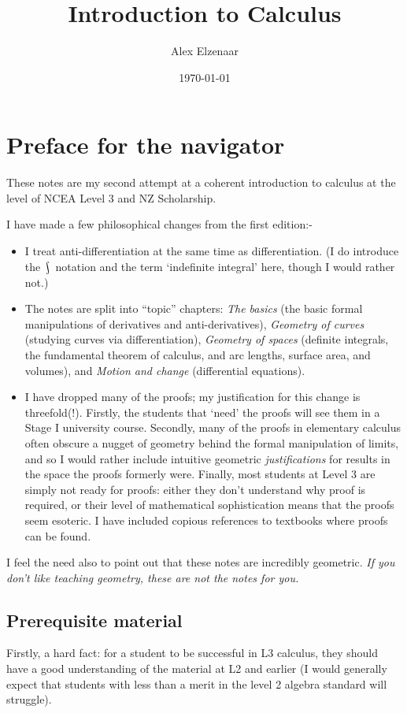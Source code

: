 \documentclass[a4paper]{memoir}
\title{Introduction to Calculus}
\author{Alex Elzenaar}
\date{\today}
\theoremstyle{definition}
\DeclareMathOperator*{\rint}{\scalerel*{\rotatebox{17}{$\!\int\!$}}{\int}}
\newlength\drop
\newcommand*{\titleGM}{\begingroup%
\drop = 0.1\textheight
\vspace*{\baselineskip}
\vfill
  \hbox{%
  \hspace*{0.2\textwidth}%
  \rule{1pt}{\dimexpr\textheight-35pt\relax}%
  \hspace*{0.05\textwidth}%
\parbox[b]{0.75\textwidth}{
  \vbox{%
    \vspace{\drop}
    {\noindent\HUGE\bfseries Level Three\\[0.5\baselineskip] Calculus}\\[2\baselineskip]
    {\Large\itshape Second Edition}\\[4\baselineskip]
    {\Large ALEX ELZENAAR}\par
    \vspace{0.5\textheight}
    {\noindent \url{https://github.com/aelzenaar/ncea-notes}}\\[\baselineskip]
    }%
}%
  }%
\vfill
\null
\endgroup}
\begin{document}
\frontmatter

\begin{titlingpage}
  \titleGM
\end{titlingpage}


\chapter{Preface for the navigator}
These notes are my second attempt at a coherent introduction to calculus at the level of NCEA
Level 3 and NZ Scholarship.

I have made a few philosophical changes from the first edition:-
\begin{itemize}
  \item I treat anti-differentiation at the same time as differentiation. (I do introduce the $ \rint $ notation
        and the term `indefinite integral' here, though I would rather not.)
  \item The notes are split into ``topic'' chapters: \textit{The basics} (the basic formal manipulations
        of derivatives and anti-derivatives), \textit{Geometry of curves} (studying curves via differentiation),
        \textit{Geometry of spaces} (definite integrals, the fundamental theorem of calculus, and arc lengths,
        surface area, and volumes), and \textit{Motion and change} (differential equations).
  \item I have dropped many of the proofs; my justification for this change is threefold(!). Firstly,
        the students that `need' the proofs will see them in a Stage I university course. Secondly, many
        of the proofs in elementary calculus often obscure a nugget of geometry behind the formal manipulation
        of limits, and so I would rather include intuitive geometric \emph{justifications} for results in the
        space the proofs formerly were. Finally, most students at Level 3 are simply not ready for proofs: either
        they don't understand why proof is required, or their level of mathematical sophistication means that
        the proofs seem esoteric. I have included copious references to textbooks where proofs can be found.
\end{itemize}

I feel the need also to point out that these notes are incredibly geometric. \emph{If you don't like teaching geometry, these are not the notes for you.}

\section{Prerequisite material}
Firstly, a hard fact: for a student to be successful in L3 calculus, they should have
a good understanding of the material at L2 and earlier (I would generally expect that
students with less than a merit in the level 2 algebra standard will struggle).
\end{document}
